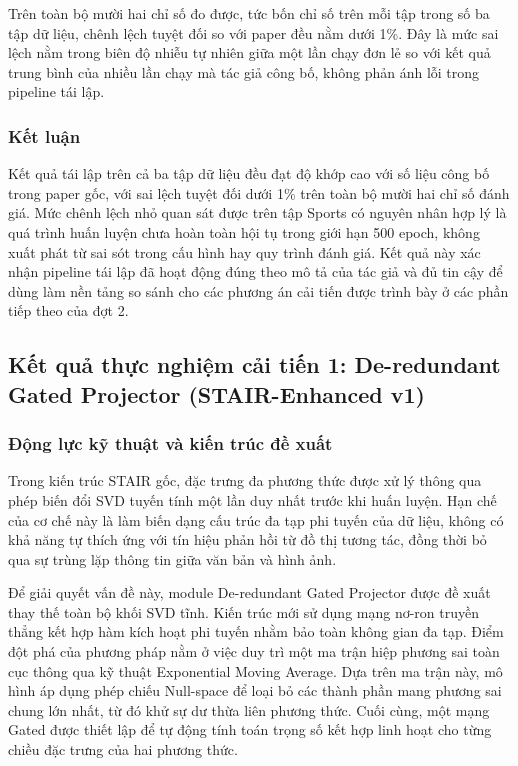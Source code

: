 Trên toàn bộ mười hai chỉ số đo được, tức bốn chỉ số trên mỗi tập trong số ba tập dữ liệu, chênh lệch tuyệt đối so với paper đều nằm dưới 1\%. Đây là mức sai lệch nằm trong biên độ nhiễu tự nhiên giữa một lần chạy đơn lẻ so với kết quả trung bình của nhiều lần chạy mà tác giả công bố, không phản ánh lỗi trong pipeline tái lập.

\subsubsection{Kết luận}

Kết quả tái lập trên cả ba tập dữ liệu đều đạt độ khớp cao với số liệu công bố trong paper gốc, với sai lệch tuyệt đối dưới 1\% trên toàn bộ mười hai chỉ số đánh giá. Mức chênh lệch nhỏ quan sát được trên tập Sports có nguyên nhân hợp lý là quá trình huấn luyện chưa hoàn toàn hội tụ trong giới hạn 500 epoch, không xuất phát từ sai sót trong cấu hình hay quy trình đánh giá. Kết quả này xác nhận pipeline tái lập đã hoạt động đúng theo mô tả của tác giả và đủ tin cậy để dùng làm nền tảng so sánh cho các phương án cải tiến được trình bày ở các phần tiếp theo của đợt 2.

\subsection{Kết quả thực nghiệm cải tiến 1: De-redundant Gated Projector (STAIR-Enhanced v1)}

\subsubsection{Động lực kỹ thuật và kiến trúc đề xuất}

Trong kiến trúc STAIR gốc, đặc trưng đa phương thức được xử lý thông qua phép biến đổi SVD tuyến tính một lần duy nhất trước khi huấn luyện. Hạn chế của cơ chế này là làm biến dạng cấu trúc đa tạp phi tuyến của dữ liệu, không có khả năng tự thích ứng với tín hiệu phản hồi từ đồ thị tương tác, đồng thời bỏ qua sự trùng lặp thông tin giữa văn bản và hình ảnh.

Để giải quyết vấn đề này, module De-redundant Gated Projector được đề xuất thay thế toàn bộ khối SVD tĩnh. Kiến trúc mới sử dụng mạng nơ-ron truyền thẳng kết hợp hàm kích hoạt phi tuyến nhằm bảo toàn không gian đa tạp. Điểm đột phá của phương pháp nằm ở việc duy trì một ma trận hiệp phương sai toàn cục thông qua kỹ thuật Exponential Moving Average. Dựa trên ma trận này, mô hình áp dụng phép chiếu Null-space để loại bỏ các thành phần mang phương sai chung lớn nhất, từ đó khử sự dư thừa liên phương thức. Cuối cùng, một mạng Gated được thiết lập để tự động tính toán trọng số kết hợp linh hoạt cho từng chiều đặc trưng của hai phương thức.

